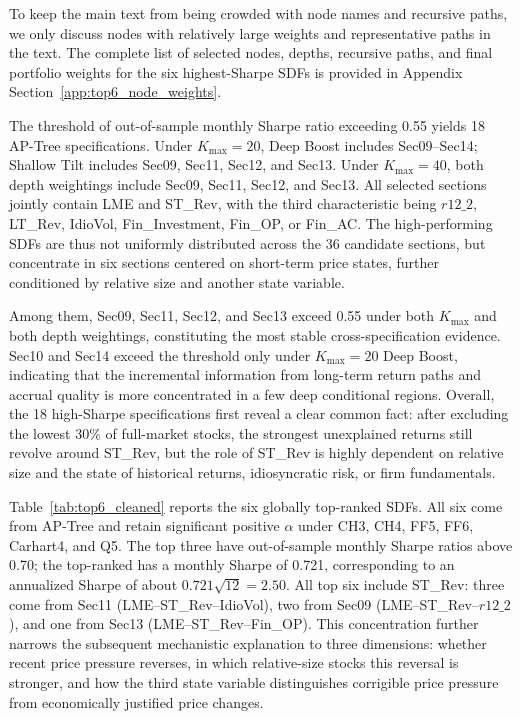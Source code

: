 \documentclass[12pt]{article}
\begin{document}
To keep the main text from being crowded with node names and recursive paths, we only discuss nodes with relatively large weights and representative paths in the text. The complete list of selected nodes, depths, recursive paths, and final portfolio weights for the six highest-Sharpe SDFs is provided in Appendix Section~\ref{app:top6_node_weights}.

The threshold of out-of-sample monthly Sharpe ratio exceeding 0.55 yields 18 AP-Tree specifications. Under \(K_{\max}=20\), Deep Boost includes Sec09–Sec14; Shallow Tilt includes Sec09, Sec11, Sec12, and Sec13. Under \(K_{\max}=40\), both depth weightings include Sec09, Sec11, Sec12, and Sec13. All selected sections jointly contain LME and ST\_Rev, with the third characteristic being \(r12\_2\), LT\_Rev, IdioVol, Fin\_Investment, Fin\_OP, or Fin\_AC. The high-performing SDFs are thus not uniformly distributed across the 36 candidate sections, but concentrate in six sections centered on short-term price states, further conditioned by relative size and another state variable.

Among them, Sec09, Sec11, Sec12, and Sec13 exceed 0.55 under both \(K_{\max}\) and both depth weightings, constituting the most stable cross-specification evidence. Sec10 and Sec14 exceed the threshold only under \(K_{\max}=20\) Deep Boost, indicating that the incremental information from long-term return paths and accrual quality is more concentrated in a few deep conditional regions. Overall, the 18 high-Sharpe specifications first reveal a clear common fact: after excluding the lowest \(30\%\) of full-market stocks, the strongest unexplained returns still revolve around ST\_Rev, but the role of ST\_Rev is highly dependent on relative size and the state of historical returns, idiosyncratic risk, or firm fundamentals.

Table~\ref{tab:top6_cleaned} reports the six globally top-ranked SDFs. All six come from AP-Tree and retain significant positive \(\alpha\) under CH3, CH4, FF5, FF6, Carhart4, and Q5. The top three have out-of-sample monthly Sharpe ratios above 0.70; the top-ranked has a monthly Sharpe of 0.721, corresponding to an annualized Sharpe of about \(0.721\sqrt{12}=2.50\). All top six include ST\_Rev: three come from Sec11 (LME–ST\_Rev–IdioVol), two from Sec09 (LME–ST\_Rev–\(r12\_2\)), and one from Sec13 (LME–ST\_Rev–Fin\_OP). This concentration further narrows the subsequent mechanistic explanation to three dimensions: whether recent price pressure reverses, in which relative-size stocks this reversal is stronger, and how the third state variable distinguishes corrigible price pressure from economically justified price changes.
\end{document}
